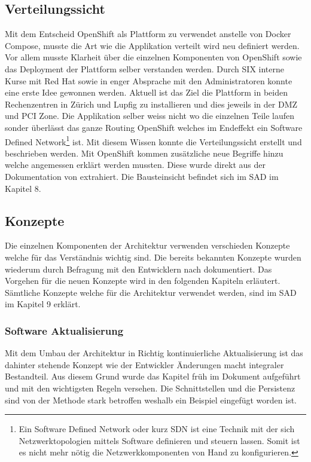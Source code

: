 \subsection{Verteilungssicht}

Mit dem Entscheid OpenShift als Plattform zu verwendet anstelle von Docker Compose, musste die Art wie die Applikation verteilt wird neu definiert werden. Vor allem musste Klarheit über die einzelnen Komponenten von OpenShift sowie das Deployment der Plattform selber verstanden werden. Durch SIX interne Kurse mit Red Hat sowie in enger Absprache mit den Administratoren konnte eine erste Idee gewonnen werden. Aktuell ist das Ziel die Plattform in beiden Rechenzentren in Zürich und Lupfig zu installieren und dies jeweils in der DMZ und PCI Zone. Die Applikation selber weiss nicht wo die einzelnen Teile laufen sonder überlässt das ganze Routing OpenShift welches im Endeffekt ein Software Defined Network\footnote{Ein Software Defined Network oder kurz SDN ist eine Technik mit der sich Netzwerktopologien mittels Software definieren und steuern lassen. Somit ist es nicht mehr nötig die Netzwerkkomponenten von Hand zu konfigurieren. } ist. Mit diesem Wissen konnte die Verteilungssicht erstellt und beschrieben werden. Mit OpenShift kommen zusätzliche neue Begriffe hinzu welche angemessen erklärt werden mussten. Diese wurde direkt aus der Dokumentation von \cite{osservicepod} extrahiert. Die Bausteinsicht befindet sich im SAD im Kapitel 8.

\subsection{Konzepte}

Die einzelnen Komponenten der Architektur verwenden verschieden Konzepte welche für das Verständnis wichtig sind. Die bereits bekannten Konzepte wurden wiederum durch Befragung mit den Entwicklern nach dokumentiert. Das Vorgehen für die neuen Konzepte wird in den folgenden Kapiteln erläutert. Sämtliche Konzepte welche für die Architektur verwendet werden, sind im SAD im Kapitel 9 erklärt.

\subsubsection{Software Aktualisierung}

Mit dem Umbau der Architektur in Richtig kontinuierliche Aktualisierung ist das dahinter stehende Konzept wie der Entwickler Änderungen macht integraler Bestandteil. Aus diesem Grund wurde das Kapitel früh im Dokument aufgeführt und mit den wichtigsten Regeln versehen. Die Schnittstellen und die Persistenz sind von der Methode stark betroffen weshalb ein Beispiel eingefügt worden ist.

